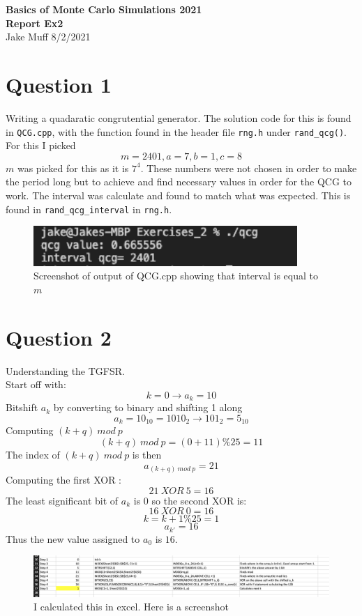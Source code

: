 \documentclass[12pt]{article}
\begin{document}
\normalsize

\baselineskip 14pt

\begin{center}
{\Large {\bf Basics of Monte Carlo Simulations 2021 \ \ \\ Report Ex2}} \\
Jake Muff
8/2/2021
\end{center}
\section*{Question 1} 
Writing a quadaratic congrutential generator. The solution code for this is found in \lstinline{QCG.cpp}, with the function found in the header file \lstinline{rng.h} under \lstinline{rand_qcg()}. For this I picked 
$$ m = 2401, a=7, b =1, c =8 $$ 
$m$ was picked for this as it is $7^4$. These numbers were not chosen in order to make the period long but to achieve and find necessary values in order for the QCG to work. The interval was calculate and found to match what was expected. This is found in \lstinline{rand_qcg_interval} in \lstinline{rng.h}. 
\begin{figure}[h]
    \centering
    \includegraphics[width=10cm]{qcg_sc.png}
    \caption{Screenshot of output of QCG.cpp showing that interval is equal to $m$}

\end{figure}

\section*{Question 2}
Understanding the TGFSR. \\
Start off with:
$$ k =0 \rightarrow a_k = 10 $$
Bitshift $a_k$ by converting to binary and shifting 1 along
$$ a_k = 10_{10} = 1010_{2} \rightarrow 101_{2} = 5_{10} $$
Computing $(k+q) \ mod \ p$ 
$$ (k+q) \ mod \ p = (0+11) \% 25 = 11$$
The index of $(k+q) \ mod \ p$ is then 
$$ a_{(k+q) \ mod \ p} = 21 $$
Computing the first XOR :
$$ 21 \ XOR \ 5 = 16 $$
The least significant bit of $a_k$ is 0 so the second XOR is: 
$$ 16 \ XOR \ 0 = 16 $$
$$ k = k+ 1 \% 25 = 1 $$
$$ a_{k'} = 16 $$ 
Thus the new value assigned to $a_0$ is $16$. 
\begin{figure}[h]
    \centering
    \includegraphics[width=15cm]{excel.png}
    \caption{I calculated this in excel. Here is a screenshot}

\end{figure}
\end{document}
